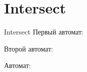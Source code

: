 \section{Intersect}
\begin{frame}{Intersect}
	Первый автомат:


	Второй автомат:


	Автомат:

\end{frame}
